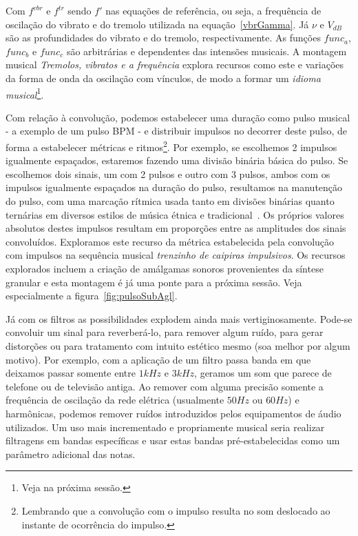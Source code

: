 Com $f^{vbr}$ e $f^{tr}$ sendo $f'$ nas equações de referência, ou seja, a frequência
de oscilação do vibrato e do tremolo utilizada na equação~\ref{vbrGamma}. Já $\nu$ e $V_{dB}$ são as profundidades
do vibrato e do tremolo, respectivamente. As funções $func_a$,
$func_b$ e $func_c$ são arbitrárias e dependentes das intensões musicais. A montagem musical 
\emph{Tremolos, vibratos e a frequência} explora
recursos como este e variações da forma de onda da oscilação com vínculos, de modo a formar um \emph{idioma musical}\footnote{Veja na próxima sessão.}.


Com relação à convolução, podemos estabelecer uma duração como pulso musical - a exemplo de um pulso BPM - 
e distribuir impulsos no decorrer deste pulso, de forma a estabelecer métricas e ritmos\footnote{Lembrando
que a convolução com o impulso resulta no som deslocado ao instante de ocorrência do impulso.}.
Por exemplo, se escolhemos 2 impulsos igualmente espaçados, estaremos fazendo uma
divisão binária básica do pulso. Se escolhemos dois sinais, um com 2 pulsos e outro com 3 pulsos,
ambos com os impulsos igualmente espaçados na duração do pulso, resultamos na manutenção
do pulso, com uma marcação rítmica usada tanto em divisões binárias quanto ternárias em diversos
estilos de música étnica e tradicional~\cite{Gramani}. 
Os próprios valores absolutos destes impulsos resultam em proporções entre as amplitudes dos sinais
convoluídos.
Exploramos este recurso da métrica
estabelecida pela convolução com impulsos na sequência musical \emph{trenzinho de caipiras impulsivos}. Os recursos explorados incluem a criação de amálgamas sonoros provenientes da síntese granular e esta montagem é já uma ponte para a próxima sessão. Veja especialmente a figura~\ref{fig:pulsoSubAgl}.

Já com os filtros as possibilidades explodem ainda mais vertiginosamente. Pode-se convoluir um sinal para reverberá-lo, para
remover algum ruído, para gerar distorções ou para tratamento com intuito estético mesmo (soa melhor por algum motivo). Por exemplo,
com a aplicação de um filtro passa banda em que deixamos passar somente entre $1kHz$ e $3kHz$, geramos um som
que parece de telefone ou de televisão antiga. Ao remover com alguma precisão somente
a frequência de oscilação da rede elétrica (usualmente $50Hz$ ou $60Hz$) e harmônicas, podemos remover
ruídos introduzidos pelos equipamentos de áudio utilizados. Um uso mais incrementado
e propriamente musical seria realizar filtragens em bandas específicas e usar estas bandas
pré-estabelecidas como um parâmetro adicional das notas.

